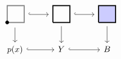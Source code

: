 \begin{center}
    \(
    \begin{tikzcd}
    \begin{tikzpicture}[x=2em, y=2em, baseline=0.7em]
        \draw[very thick, black!50] (0,0)--(1,0)--(1,1)--(0,1)--(0,0);
        \filldraw (0,0) circle (2pt);
    \end{tikzpicture}
    \ar[r, hook]\ar[d]
    & 
    \begin{tikzpicture}[x=2em, y=2em, baseline=0.7em]
        \draw[very thick] (0,0)--(1,0)--(1,1)--(0,1)--(0,0);
    \end{tikzpicture} 
    \ar[r, hook]\ar[d]
    &
    \begin{tikzpicture}[x=2em, y=2em, baseline=0.7em]
        \filldraw[very thick, fill=blue!20] (0,0)--(1,0)--(1,1)--(0,1)--(0,0);
    \end{tikzpicture}
    \ar[d]\\
    p(x)\ar[r, hook]&Y\ar[r, hook]&B
    \end{tikzcd}
    \)
\end{center}